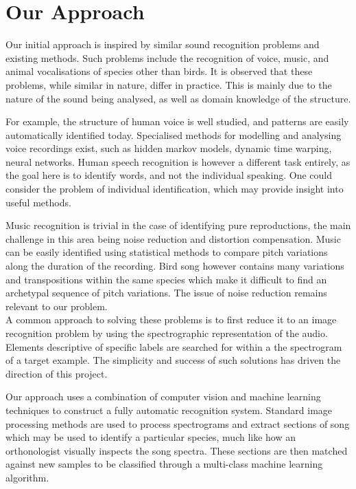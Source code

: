 \section{Our Approach}
Our initial approach is inspired by similar sound recognition problems and
existing methods.
Such problems include the recognition of voice, music, and animal vocalisations
of species other than birds.
It is observed that these problems, while similar in nature, differ in practice.
This is mainly due to the nature of the sound being analysed, as well as
domain knowledge of the structure.

For example, the structure of human voice is well studied, and patterns are
easily automatically identified today.
Specialised methods for modelling and analysing voice recordings exist, such as 
hidden markov models, dynamic time warping, neural networks.
Human speech recognition is however a different task entirely, as the goal here
is to identify words, and not the individual speaking.
One could consider the problem of individual identification, which may provide
insight into useful methods.

Music recognition is trivial in the case of identifying pure reproductions,
the main challenge in this area being noise reduction and distortion compensation.
Music can be easily identified using statistical methods to compare pitch
variations along the duration of the recording.
Bird song however contains many variations and transpositions within the same
species which make it difficult to find an archetypal sequence of pitch
variations.
The issue of noise reduction remains relevant to our problem.\\

A common approach to solving these problems is to first reduce it to an image
recognition problem by using the spectrographic representation of the audio.
Elements descriptive of specific labels are searched for within a the
spectrogram of a target example.
The simplicity and success of such solutions has driven the direction of this
project.

Our approach uses a combination of computer vision and machine learning
techniques to construct a fully automatic recognition system.
Standard image processing methods are used to process spectrograms and extract
sections of song which may be used to identify a particular species, much like
how an orthonologist visually inspects the song spectra.
These sections are then matched against new samples to be classified through a
multi-class machine learning algorithm.

